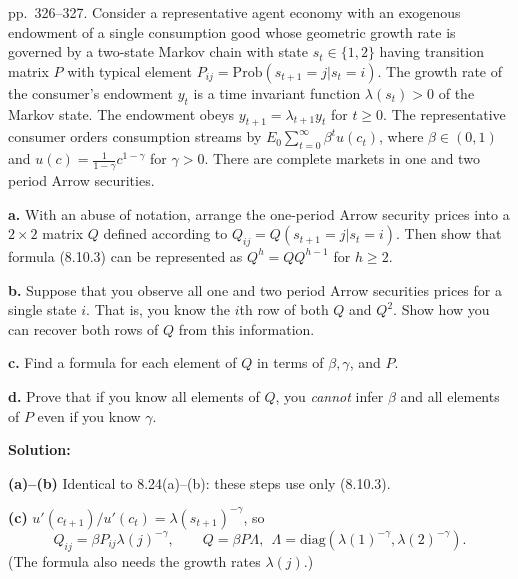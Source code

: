 \documentclass[12pt, letterpaper]{article}
\begin{document}
\begin{tcolorbox}[oddbox,title={Exercise 8.25 \quad Recovering probabilities from prices, II}]
\begin{tcolorbox}[questionbox]
pp.~326--327. Consider a representative agent economy with an exogenous endowment of a single
consumption good whose geometric growth rate is governed by a two-state Markov chain with state
$s_t\in\{1,2\}$ having transition matrix $P$ with typical element $P_{ij}=\mathrm{Prob}(s_{t+1}=j|s_t=i)$. The
growth rate of the consumer's endowment $y_t$ is a time invariant function $\lambda(s_t)>0$ of the Markov state.
The endowment obeys $y_{t+1}=\lambda_{t+1}y_t$ for $t\ge0$. The representative consumer orders consumption
streams by $E_0\sum_{t=0}^\infty\beta^tu(c_t)$, where $\beta\in(0,1)$ and $u(c)=\frac{1}{1-\gamma}c^{1-\gamma}$ for $\gamma>0$.
There are complete markets in one and two period Arrow securities.

\textbf{a.} With an abuse of notation, arrange the one-period Arrow security prices into a $2\times2$ matrix $Q$
defined according to $Q_{ij}=Q(s_{t+1}=j|s_t=i)$. Then show that formula (8.10.3) can be represented as
$Q^h=QQ^{h-1}$ for $h\ge2$.

\textbf{b.} Suppose that you observe all one and two period Arrow securities prices for a single state $i$.
That is, you know the $i$th row of both $Q$ and $Q^2$. Show how you can recover both rows of $Q$ from this
information.

\textbf{c.} Find a formula for each element of $Q$ in terms of $\beta,\gamma$, and $P$.

\textbf{d.} Prove that if you know all elements of $Q$, you \emph{cannot} infer $\beta$ and all elements of $P$ even
if you know $\gamma$.
\end{tcolorbox}

\textbf{Solution:}

\textbf{(a)--(b)} Identical to 8.24(a)--(b): these steps use only (8.10.3).

\textbf{(c)} $u'(c_{t+1})/u'(c_t)=\lambda(s_{t+1})^{-\gamma}$, so
\[
Q_{ij}=\beta P_{ij}\lambda(j)^{-\gamma},\qquad Q=\beta P\Lambda,\ \ \Lambda=\mathrm{diag}(\lambda(1)^{-\gamma},\lambda(2)^{-\gamma}).
\]
(The formula also needs the growth rates $\lambda(j)$.)


\end{tcolorbox}
\end{document}
